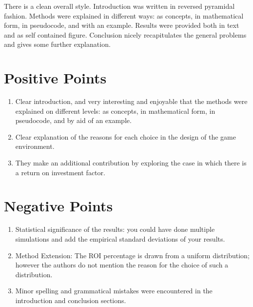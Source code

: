 \documentclass[letterpaper]{article}
\begin{document}
There is a clean overall style.
Introduction was written in reversed pyramidal fashion.
Methods were explained in different ways:
as concepts, in mathematical form, in pseudocode, and with an example.
Results were provided both in text and as self contained figure. 
Conclusion nicely recapitulates the general problems and gives some further explanation.

\section{Positive Points}
\begin{enumerate}
    \item Clear introduction, and very interesting and enjoyable that the methods were explained on different levels: as concepts, in mathematical form, in pseudocode, and by aid of an example.
    \item Clear explanation of the reasons for each choice in the design of the game environment.
    \item They make an additional contribution by exploring the case in which there is a return on investment factor.
\end{enumerate}

\section{Negative Points}
\begin{enumerate}
    \item Statistical significance of the results: you could have done multiple simulations and add the empirical standard deviations of your results.
    \item Method Extension: The ROI percentage is drawn from a uniform distribution; however the authors do not mention the reason for the choice of such a distribution.
    \item Minor spelling and grammatical mistakes were encountered in the introduction and conclusion sections.
\end{enumerate}
\end{document}
